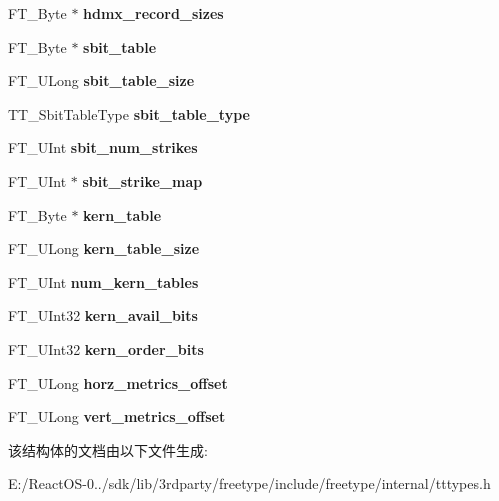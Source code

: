 \begin{DoxyCompactItemize}
F\+T\+\_\+\+Byte $\ast$ {\bfseries hdmx\+\_\+record\+\_\+sizes}
\item 
\mbox{\label{struct_t_t___face_rec___ade433be10a16d4193e3527c5b1b73fcd}} 
F\+T\+\_\+\+Byte $\ast$ {\bfseries sbit\+\_\+table}
\item 
\mbox{\label{struct_t_t___face_rec___ae16d371d8ca112b3e1f4cd35c256c829}} 
F\+T\+\_\+\+U\+Long {\bfseries sbit\+\_\+table\+\_\+size}
\item 
\mbox{\label{struct_t_t___face_rec___a0e4c61a4dec0b1c99009b883dd037484}} 
T\+T\+\_\+\+Sbit\+Table\+Type {\bfseries sbit\+\_\+table\+\_\+type}
\item 
\mbox{\label{struct_t_t___face_rec___a763b677d9356ea3ba116d113ebcb39e1}} 
F\+T\+\_\+\+U\+Int {\bfseries sbit\+\_\+num\+\_\+strikes}
\item 
\mbox{\label{struct_t_t___face_rec___a687f59d507215d9d74ff345931ae778c}} 
F\+T\+\_\+\+U\+Int $\ast$ {\bfseries sbit\+\_\+strike\+\_\+map}
\item 
\mbox{\label{struct_t_t___face_rec___ae445fbf0615a96f81b034b77ae1343a2}} 
F\+T\+\_\+\+Byte $\ast$ {\bfseries kern\+\_\+table}
\item 
\mbox{\label{struct_t_t___face_rec___acfef0fabbe95af382fb0710edfe98887}} 
F\+T\+\_\+\+U\+Long {\bfseries kern\+\_\+table\+\_\+size}
\item 
\mbox{\label{struct_t_t___face_rec___a9c5b27564d0c22e0ee6edd7b6dc675c0}} 
F\+T\+\_\+\+U\+Int {\bfseries num\+\_\+kern\+\_\+tables}
\item 
\mbox{\label{struct_t_t___face_rec___a5f97232ee6773a57ef8734555cc960e1}} 
F\+T\+\_\+\+U\+Int32 {\bfseries kern\+\_\+avail\+\_\+bits}
\item 
\mbox{\label{struct_t_t___face_rec___a810b4e002ebbdfcb44005cb69b09a917}} 
F\+T\+\_\+\+U\+Int32 {\bfseries kern\+\_\+order\+\_\+bits}
\item 
\mbox{\label{struct_t_t___face_rec___a5ff62c77d90743e333ca8dfa7d382f22}} 
F\+T\+\_\+\+U\+Long {\bfseries horz\+\_\+metrics\+\_\+offset}
\item 
\mbox{\label{struct_t_t___face_rec___a33baf2e26d533d82f06875361fd423d1}} 
F\+T\+\_\+\+U\+Long {\bfseries vert\+\_\+metrics\+\_\+offset}
\end{DoxyCompactItemize}


该结构体的文档由以下文件生成\+:\begin{DoxyCompactItemize}
\item 
E\+:/\+React\+O\+S-\/0../sdk/lib/3rdparty/freetype/include/freetype/internal/tttypes.\+h\end{DoxyCompactItemize}
